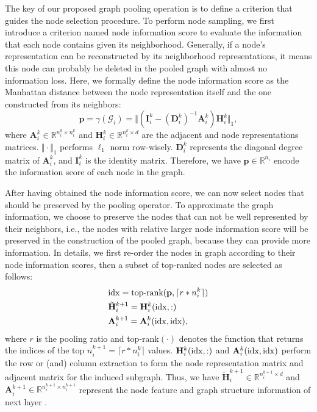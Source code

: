 \documentclass[letterpaper]{article} \usepackage{aaai20}  \usepackage{times}  \usepackage{helvet} \usepackage{courier}  \usepackage[hyphens]{url}  \usepackage{graphicx} \urlstyle{rm} \def\UrlFont{\rm}  \usepackage{graphicx}  \frenchspacing  \setlength{\pdfpagewidth}{8.5in}  \setlength{\pdfpageheight}{11in}
\begin{document}
The key of our proposed graph pooling operation is to define a criterion that guides the node selection procedure. To perform node sampling, we first introduce a criterion named node information score to evaluate the information that each node contains given its neighborhood. Generally, if a node's representation can be reconstructed by its neighborhood representations, it means this node can probably be deleted in the pooled graph with almost no information loss. Here, we formally define the node information score as the Manhattan distance between the node representation itself and the one constructed from its neighbors:
\begin{equation}
	\mathbf{p} = \gamma(\mathcal{G}_i) = \Vert(\mathbf{I}_i^k - (\mathbf{D}_i^k)^{-1}\mathbf{A}_i^k)\mathbf{H}_i^k\Vert_1,
	\label{eq:rank}
\end{equation}  
where $\mathbf{A}_i^k \in \mathbb{R}^{n_i^k \times n_i^k}$ and $\mathbf{H}_i^k \in \mathbb{R}^{n_i^k \times d}$ are the adjacent and node representations matrices. $\Vert\cdot\Vert_1$ performs $\ell_1$ norm row-wisely. $\mathbf{D}_i^k$ represents the diagonal degree matrix of $\mathbf{A}_i^k$, and $\mathbf{I}_i^k$ is the identity matrix. Therefore, we have $\mathbf{p} \in \mathbb{R}^{n_i}$ encode the information score of each node in the graph.

After having obtained the node information score, we can now select nodes that should be preserved by the pooling operator. To approximate the graph information, we choose to preserve the nodes that can not be well represented by their neighbors, i.e., the nodes with relative larger node information score will be preserved in the construction of the pooled graph, because they can provide more information. In details, we first re-order the nodes in graph according to their node information scores, then a subset of top-ranked nodes are selected as follows:
\begin{eqnarray}
	&{\rm idx} = \text{top-rank}(\mathbf{p}, \lceil{r*n_i^k}\rceil) \nonumber \\
	&\tilde{\mathbf{H}}_i^{k+1} = \mathbf{H}_i^k({\rm idx},:) \\
	&\mathbf{A}_i^{k+1} = \mathbf{A}_{i}^k({\rm idx}, {\rm idx}), \nonumber
\end{eqnarray}
where $r$ is the pooling ratio and top-rank$(\cdot)$ denotes the function that returns the indices of the top $n_i^{k+1}=\lceil r*n_i^k \rceil$ values. $\mathbf{H}_i^k({\rm idx},:)$ and $\mathbf{A}_i^k({\rm idx}, {\rm idx})$ perform the row or (and) column extraction to form the node representation matrix and adjacent matrix for the induced subgraph. Thus, we have $\tilde{\mathbf{H}}_i^{k+1} \in \mathbb{R}^{n_i^{k+1} \times d}$ and $\mathbf{A}_i^{k+1} \in \mathbb{R}^{n_i^{k+1} \times n_i^{k+1}}$ represent the node feature and graph structure information of next layer .
\end{document}
